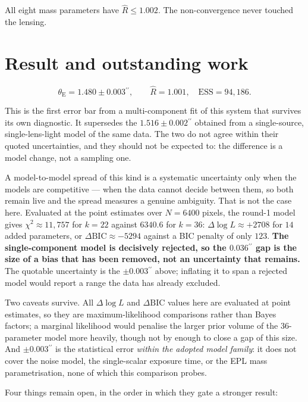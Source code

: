 \documentclass[11pt]{article}
\newcommand{\arcsec}{\ensuremath{^{\prime\prime}}}
\newcommand{\thetaE}{\ensuremath{\theta_{\mathrm{E}}}}
\begin{document}
All eight mass parameters have $\hat{R} \le 1.002$. The non-convergence never touched the
lensing.

\section{Result and outstanding work}

\begin{equation}
  \thetaE = 1.480 \pm 0.003\arcsec, \qquad \hat{R} = 1.001, \quad \mathrm{ESS} = 94{,}186.
\end{equation}

This is the first error bar from a multi-component fit of this system that survives its
own diagnostic. It supersedes the $1.516 \pm 0.002\arcsec$ obtained from a
single-source, single-lens-light model of the same data. The two do not agree within their
quoted uncertainties, and they should not be expected to: the difference is a model
change, not a sampling one.

A model-to-model spread of this kind is a systematic uncertainty only when the models are
competitive --- when the data cannot decide between them, so both remain live and the
spread measures a genuine ambiguity. That is not the case here. Evaluated at the point
estimates over $N = 6400$ pixels, the round-1 model gives $\chi^2 \approx 11{,}757$ for
$k = 22$ against $6340.6$ for $k = 36$: $\Delta \log L \approx +2708$ for $14$ added
parameters, or $\Delta\mathrm{BIC} \approx -5294$ against a BIC penalty of only $123$.
\textbf{The single-component model is decisively rejected, so the $0.036\arcsec$ gap is
the size of a bias that has been removed, not an uncertainty that remains.} The quotable
uncertainty is the $\pm 0.003\arcsec$ above; inflating it to span a rejected model would
report a range the data has already excluded.

Two caveats survive. All $\Delta\log L$ and $\Delta\mathrm{BIC}$ values here are evaluated
at point estimates, so they are maximum-likelihood comparisons rather than Bayes factors;
a marginal likelihood would penalise the larger prior volume of the 36-parameter model
more heavily, though not by enough to close a gap of this size. And $\pm 0.003\arcsec$ is
the statistical error \emph{within the adopted model family}: it does not cover the noise
model, the single-scalar exposure time, or the EPL mass parametrisation, none of which
this comparison probes.

Four things remain open, in the order in which they gate a stronger result:
\end{document}
